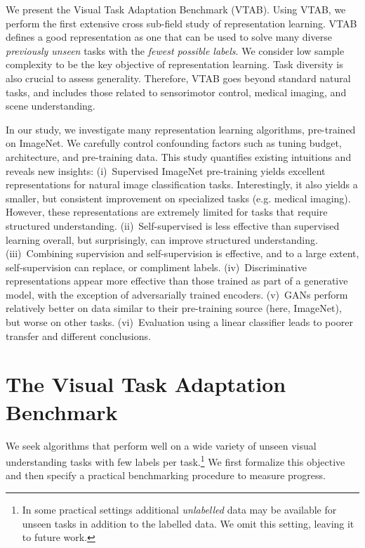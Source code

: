 We present the Visual Task Adaptation Benchmark (VTAB). Using VTAB, we perform the first extensive cross sub-field study of representation learning. VTAB defines a good representation as one that can be used to solve many diverse \emph{previously unseen} tasks with the \emph{fewest possible labels}. We consider low sample complexity to be the key objective of representation learning. Task diversity is also crucial to assess generality. Therefore, VTAB goes beyond standard natural tasks, and includes those related to sensorimotor control, medical imaging, and scene understanding.

In our study, we investigate many representation learning algorithms, pre-trained on ImageNet. We carefully control confounding factors such as tuning budget, architecture, and pre-training data. This study quantifies existing intuitions and reveals new insights: (i)~Supervised ImageNet pre-training yields excellent representations for natural image classification tasks. Interestingly, it also yields a smaller, but consistent improvement on specialized tasks (e.g. medical imaging). However, these representations are extremely limited for tasks that require structured understanding. (ii)~Self-supervised is less effective than supervised learning overall, but surprisingly, can improve structured understanding. (iii)~Combining supervision and self-supervision is effective, and to a large extent, self-supervision can replace, or compliment labels. (iv)~Discriminative representations appear more effective than those trained as part of a generative model, with the exception of adversarially trained encoders. (v)~GANs perform relatively better on data similar to their pre-training source (here, ImageNet), but worse on other tasks. (vi)~Evaluation using a linear classifier leads to poorer transfer and different conclusions.

\section{The Visual Task Adaptation Benchmark}

We seek algorithms that perform well on a wide variety of unseen visual understanding tasks with few labels per task.\footnote{
In some practical settings additional \emph{unlabelled} data may be available for unseen tasks in addition to the labelled data. We omit this setting, leaving it to future work.} We first formalize this objective and then specify a practical benchmarking procedure to measure progress.

